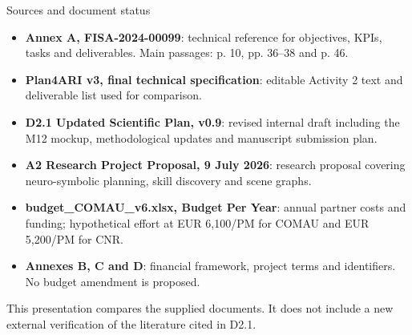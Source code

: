 \documentclass[aspectratio=169,11pt]{beamer}
\begin{document}
\begin{frame}{Sources and document status}
\small
\begin{itemize}\setlength{\itemsep}{2pt}
\item \textbf{Annex A, FISA-2024-00099}: technical reference for objectives, KPIs, tasks and deliverables. Main passages: p. 10, pp. 36--38 and p. 46.
\item \textbf{Plan4ARI v3, final technical specification}: editable Activity 2 text and deliverable list used for comparison.
\item \textbf{D2.1 Updated Scientific Plan, v0.9}: revised internal draft including the M12 mockup, methodological updates and manuscript submission plan.
\item \textbf{A2 Research Project Proposal, 9 July 2026}: research proposal covering neuro-symbolic planning, skill discovery and scene graphs.
\item \textbf{budget\_COMAU\_v6.xlsx, Budget Per Year}: annual partner costs and funding; hypothetical effort at EUR 6,100/PM for COMAU and EUR 5,200/PM for CNR.
\item \textbf{Annexes B, C and D}: financial framework, project terms and identifiers. No budget amendment is proposed.
\end{itemize}
\medskip
This presentation compares the supplied documents. It does not include a new external verification of the literature cited in D2.1.
\end{frame}
\end{document}
